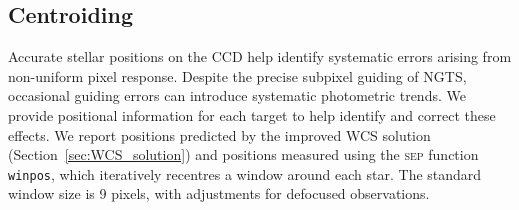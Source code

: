 \documentclass[fleqn,usenatbib]{mnras}
\newcommand{\ngts}{{NGTS}}
\newcommand{\tess}{{\it TESS}}
\begin{document}



\subsection{Centroiding}\label{sec:centroiding}

Accurate stellar positions on the CCD help identify systematic errors arising from non-uniform pixel response. Despite the precise subpixel guiding of \ngts, occasional guiding errors can introduce systematic photometric trends. We provide positional information for each target to help identify and correct these effects. We report positions predicted by the improved WCS solution (Section~\ref{sec:WCS_solution}) and positions measured using the \textsc{sep} function \texttt{winpos}, which iteratively recentres a window around each star. The standard window size is 9 pixels, with adjustments for defocused observations. %
\end{document}
